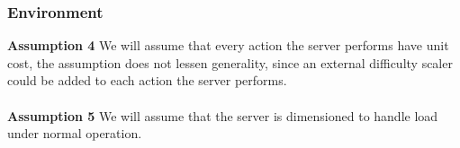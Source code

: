 \subsubsection{Environment}
\noindent \textbf{Assumption 4} \indent We will assume that every action the server performs have unit cost, the assumption does not lessen generality, since an external difficulty scaler could be added to each action the server performs.
\\
\\
\noindent \textbf{Assumption 5}\label{ass:5} \indent We will assume that the server is dimensioned to handle load under normal operation.